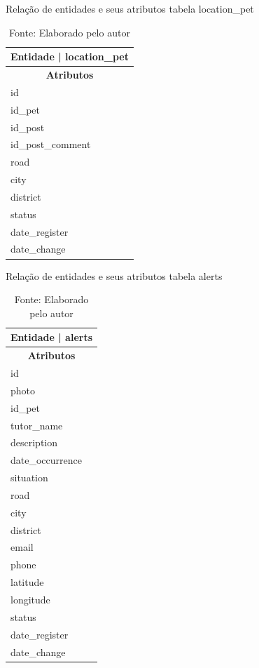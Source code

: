\begin{table}[htb]
  \centering
  \caption{Relação de entidades e seus atributos tabela location\_pet}
  \begin{tabular}{|p{4cm}|}
    \hline
    \multicolumn{2}{|c|}{\textbf{Entidade} | \textbf{location\_pet}} \\
    \hline
    \multicolumn{1}{|c|}{\textbf{Atributos}} \\
    \hline
    id \\
    \hline
    id\_pet \\
    \hline
    id\_post \\
    \hline
    id\_post\_comment \\
    \hline
    road \\
    \hline
    city \\
    \hline
    district \\
    \hline
    status \\
    \hline
    date\_register \\
    \hline
    date\_change \\
    \hline
  \end{tabular}
  \caption*{\small Fonte: Elaborado pelo autor}
  \label{tab:Plataformas1}
\end{table}

\begin{table}[htb]
  \centering
  \caption{Relação de entidades e seus atributos tabela alerts}
  \begin{tabular}{|p{4cm}|}
    \hline
    \multicolumn{2}{|c|}{\textbf{Entidade} | \textbf{alerts}} \\
    \hline
    \multicolumn{1}{|c|}{\textbf{Atributos}} \\
    \hline
    id \\
    \hline
    photo \\
    \hline
    id\_pet \\
    \hline
    tutor\_name \\
    \hline
    description \\
    \hline
    date\_occurrence \\
    \hline
    situation \\
    \hline
    road \\
    \hline
    city \\
    \hline
    district \\
    \hline
    email \\
    \hline
    phone \\
    \hline
    latitude \\
    \hline
    longitude \\
    \hline
    status \\
    \hline
    date\_register \\
    \hline
    date\_change \\
    \hline
  \end{tabular}
  \caption*{\small Fonte: Elaborado pelo autor}
  \label{tab:Plataformas1}
\end{table}

